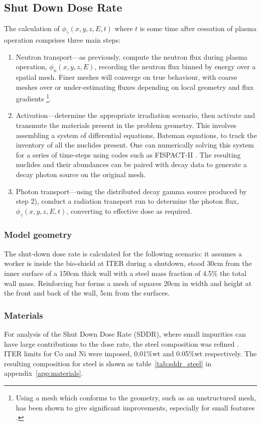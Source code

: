 \subsection{Shut Down Dose Rate}
The calculation of $\phi_{\gamma}(x,y,z,E,t)$ where $t$ is some time after cessation of plasma operation comprises three main steps:
\begin{enumerate}
  \item Neutron transport---as previously, compute the neutron flux during plasma operation, $\phi_{n}(x,y,z,E)$, recording the neutron flux binned by energy over a spatial mesh. Finer meshes will converge on true behaviour, with coarse meshes over or under-estimating fluxes depending on local geometry and flux gradients \footnote{Using a mesh which conforms to the geometry, such as an unstructured mesh, has been shown to give significant improvements, especially for small features \cite{Eade2015}.}.
  \item Activation---determine the appropriate irradiation scenario, then activate and transmute the materials present in the problem geometry. This involves assembling a system of differential equations, Bateman equations, to track the inventory of all the nuclides present. One can numerically solving this system for a series of time-steps using codes such as FISPACT-II \cite{sublet2017a}. The resulting nuclides and their abundances can be paired with decay data to generate a decay photon source on the original mesh. 
  \item Photon transport---using the distributed decay gamma source produced by step 2), conduct a radiation transport run to determine the photon flux, $\phi_{\gamma}(x,y,z,E,t)$, converting to effective dose as required.
\end{enumerate}

\subsubsection{Model geometry}
The shut-down dose rate is calculated for the following scenario: it assumes a worker is inside the bio-shield at ITER during a shutdown, stood 30cm from the inner surface of a 150cm thick wall with a steel mass fraction of 4.5\% the total wall mass. Reinforcing bar forms a mesh of squares 20cm in width and height at the front and back of the wall, 5cm from the surfaces. 

\subsubsection{Materials}
For analysis of the Shut Down Dose Rate (SDDR), where small impurities can have large contributions to the dose rate, the steel composition was refined \cite{Barabash16}. ITER limits for Co and Ni were imposed, 0.01\%wt and 0.05\%wt respectively. The resulting composition for steel is shown as table~\ref{tab:sddr_steel} in appendix~\ref{app:materials}.

